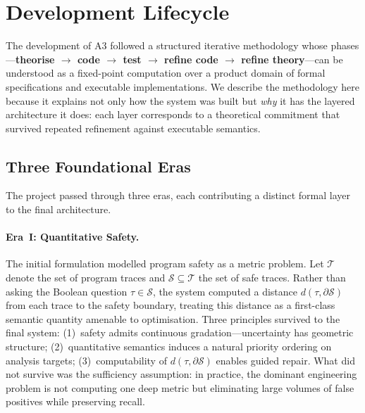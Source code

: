 \section{Development Lifecycle}\label{sec:lifecycle}

The development of \textsc{A3} followed a structured iterative methodology whose phases---\textbf{theorise $\to$ code $\to$ test $\to$ refine code $\to$ refine theory}---can be understood as a fixed-point computation over a product domain of formal specifications and executable implementations.
We describe the methodology here because it explains not only how the system was built but \emph{why} it has the layered architecture it does: each layer corresponds to a theoretical commitment that survived repeated refinement against executable semantics.

\subsection{Three Foundational Eras}

The project passed through three eras, each contributing a distinct formal layer to the final architecture.

\paragraph{Era~I: Quantitative Safety.}
The initial formulation modelled program safety as a metric problem.
Let $\mathcal{T}$ denote the set of program traces and $\mathcal{S} \subseteq \mathcal{T}$ the set of safe traces.
Rather than asking the Boolean question $\tau \in \mathcal{S}$, the system computed a distance $d(\tau, \partial\mathcal{S})$ from each trace to the safety boundary, treating this distance as a first-class semantic quantity amenable to optimisation.
Three principles survived to the final system:
(1)~safety admits continuous gradation---uncertainty has geometric structure;
(2)~quantitative semantics induces a natural priority ordering on analysis targets;
(3)~computability of $d(\tau, \partial\mathcal{S})$ enables guided repair.
What did not survive was the sufficiency assumption: in practice, the dominant engineering problem is not computing one deep metric but eliminating large volumes of false positives while preserving recall.

